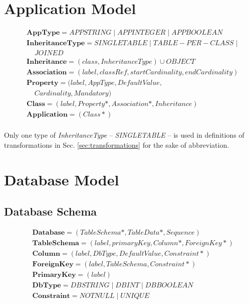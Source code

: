 \documentclass[10pt]{article}
\begin{document}
\section{Application Model}
\begin{align}
& \mathbf{AppType} = APPSTRING \;|\; APPINTEGER \;|\; APPBOOLEAN \\
& \mathbf{InheritanceType} = SINGLETABLE \; | \; TABLE-PER-CLASS  \; |  \; \\ & \;\;\;\;   JOINED\\
& \mathbf{Inheritance} = (class, InheritanceType) \cup OBJECT \\
& \mathbf{Association} = (label, classRef, startCardinality, endCardinality)  \\
& \mathbf{Property} = (label, AppType, DefaultValue, \nonumber \\ & \;\;\;\;  Cardinality, Mandatory) \\
& \mathbf{Class} = (label, Property*, Association*, Inheritance) \\
& \mathbf{Application} = (Class*) \\
\end{align}

Only one type of \emph{InheritanceType} -- \emph{SINGLETABLE} -- is used in definitions of transformations in Sec. \ref{sec:transformations} for the sake of abbreviation. 


\section{Database Model}
\subsection{Database Schema}
\begin{align}
&	\mathbf{Database} = ( TableSchema*, TableData*, Sequence )\\
&	\mathbf{TableSchema} = (label, primaryKey, Column*, ForeignKey*)\\
&	\mathbf{Column} = (label, DbType, DefaultValue, Constraint*) \\
&	\mathbf{ForeignKey} = (label, TableSchema, Constraint*) \\
&	\mathbf{PrimaryKey} =  ( label ) \\
&	\mathbf{DbType} = DBSTRING \; | \; DBINT \; | \; DBBOOLEAN\\
&	\mathbf{Constraint} = NOTNULL \; | \; UNIQUE 
\end{align}
\end{document}

